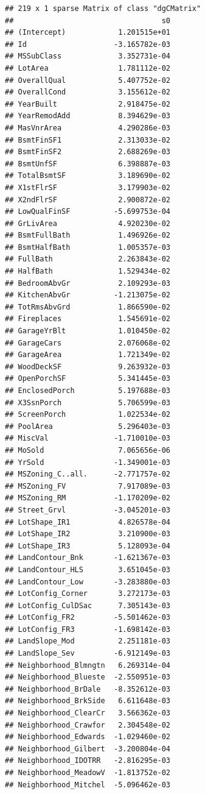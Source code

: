 \documentclass[
]{article}
\begin{document}
\begin{verbatim}
## 219 x 1 sparse Matrix of class "dgCMatrix"
##                                  s0
## (Intercept)            1.201515e+01
## Id                    -3.165782e-03
## MSSubClass             3.352731e-04
## LotArea                1.781112e-02
## OverallQual            5.407752e-02
## OverallCond            3.155612e-02
## YearBuilt              2.918475e-02
## YearRemodAdd           8.394629e-03
## MasVnrArea             4.290286e-03
## BsmtFinSF1             2.313033e-02
## BsmtFinSF2             2.688269e-03
## BsmtUnfSF              6.398887e-03
## TotalBsmtSF            3.189690e-02
## X1stFlrSF              3.179903e-02
## X2ndFlrSF              2.900872e-02
## LowQualFinSF          -5.699753e-04
## GrLivArea              4.920230e-02
## BsmtFullBath           1.496926e-02
## BsmtHalfBath           1.005357e-03
## FullBath               2.263843e-02
## HalfBath               1.529434e-02
## BedroomAbvGr           2.109293e-03
## KitchenAbvGr          -1.213075e-02
## TotRmsAbvGrd           1.866590e-02
## Fireplaces             1.545691e-02
## GarageYrBlt            1.010450e-02
## GarageCars             2.076068e-02
## GarageArea             1.721349e-02
## WoodDeckSF             9.263932e-03
## OpenPorchSF            5.341445e-03
## EnclosedPorch          5.197688e-03
## X3SsnPorch             5.706599e-03
## ScreenPorch            1.022534e-02
## PoolArea               5.296403e-03
## MiscVal               -1.710010e-03
## MoSold                 7.065656e-06
## YrSold                -1.349001e-03
## MSZoning_C..all.      -2.771757e-02
## MSZoning_FV            7.917089e-03
## MSZoning_RM           -1.170209e-02
## Street_Grvl           -3.045201e-03
## LotShape_IR1           4.826578e-04
## LotShape_IR2           3.210900e-03
## LotShape_IR3           5.128093e-04
## LandContour_Bnk       -1.621367e-03
## LandContour_HLS        3.651045e-03
## LandContour_Low       -3.283880e-03
## LotConfig_Corner       3.272173e-03
## LotConfig_CulDSac      7.305143e-03
## LotConfig_FR2         -5.501462e-03
## LotConfig_FR3         -1.698142e-03
## LandSlope_Mod          2.251181e-03
## LandSlope_Sev         -6.912149e-03
## Neighborhood_Blmngtn   6.269314e-04
## Neighborhood_Blueste  -2.550951e-03
## Neighborhood_BrDale   -8.352612e-03
## Neighborhood_BrkSide   6.611648e-03
## Neighborhood_ClearCr   3.566362e-03
## Neighborhood_Crawfor   2.304548e-02
## Neighborhood_Edwards  -1.029460e-02
## Neighborhood_Gilbert  -3.200804e-04
## Neighborhood_IDOTRR   -2.816295e-03
## Neighborhood_MeadowV  -1.813752e-02
## Neighborhood_Mitchel  -5.096462e-03

\end{verbatim}
\end{document}
